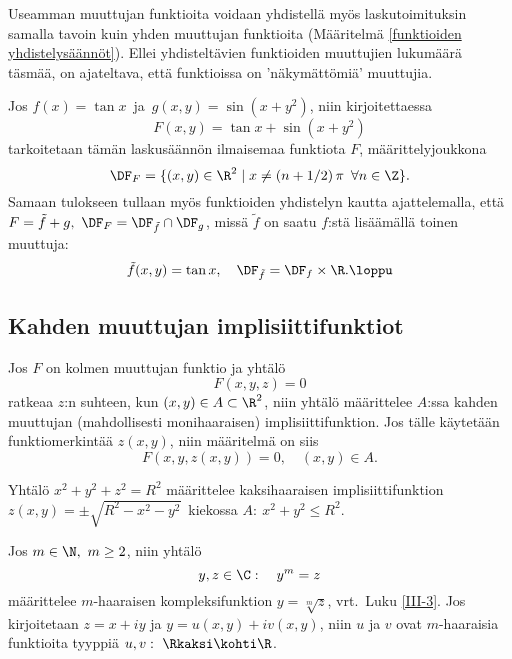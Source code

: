 Useamman muuttujan funktioita voidaan yhdistellä myös laskutoimituksin samalla tavoin kuin
yhden muuttujan funktioita (Määritelmä \ref{funktioiden yhdistelysäännöt}).  Ellei
yhdisteltävien funktioiden muuttujien lukumäärä täsmää, on ajateltava, että funktioissa on 
'näkymättömiä' muuttujia. 
\begin{Exa} Jos $f(x) = \tan x\,$ ja $\,g(x,y) = \sin(x+y^2)$, niin kirjoitettaessa
\[ 
F(x,y) = \tan x + \sin (x+y^2) 
\]
tarkoitetaan tämän laskusäännön ilmaisemaa funktiota $F$, määrittelyjoukkona 
\[ 
\DF_F = \{(x,y) \in \R^2 \mid x \neq (n+1/2)\,\pi\,\ \forall n \in \Z\}.
\]
Samaan tulokseen tullaan myös funktioiden yhdistelyn kautta ajattelemalla, että
$F = \tilde{f} + g,\ \DF_F = \DF_{\tilde{f}} \cap \DF_g$, missä $\tilde{f}$ on saatu $f$:stä
lisäämällä toinen muuttuja:
\[ 
\tilde{f}(x,y) = \tan x, \quad \DF_{\tilde{f}} = \DF_f \times \R. \loppu
\] 
\end{Exa}

\subsection{Kahden muuttujan implisiittifunktiot}

Jos $F$ on kolmen muuttujan funktio ja yhtälö
\[
F(x,y,z)=0
\]
ratkeaa $z$:n suhteen, kun $(x,y)\in A\subset\R^2$, niin yhtälö määrittelee $A$:ssa
kahden muuttujan (mahdollisesti monihaaraisen) implisiittifunktion. Jos tälle käytetään
funktiomerkintää $z(x,y)$, niin määritelmä on siis
\[
F(x,y,z(x,y))=0, \quad (x,y)\in A.
\]
\begin{Exa}
Yhtälö $x^2+y^2+z^2=R^2$ määrittelee kaksihaaraisen implisiittifunktion
$z(x,y)=\pm\sqrt{R^2-x^2-y^2}\,$ kiekossa $A:\ x^2+y^2 \le R^2$. \loppu
\end{Exa}
\begin{Exa} Jos $m\in\N,\ m \ge 2$, niin yhtälö
\[
y,z\in\C: \quad y^m=z
\]
määrittelee $m$-haaraisen kompleksifunktion $y=\sqrt[m]{z}$, vrt.\ Luku \ref{III-3}.
Jos kirjoitetaan $z=x+iy$ ja $y=u(x,y)+iv(x,y)$, niin $u$ ja $v$ ovat $m$-haaraisia
funktioita tyyppiä $u,v:\ \Rkaksi\kohti\R$. \loppu
\end{Exa}

